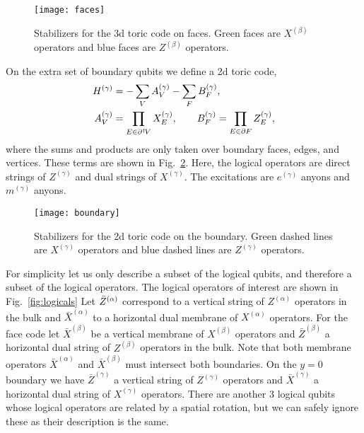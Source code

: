 \begin{figure}
\centering
\texttt{[image: faces]}
\caption[Stabilizers for the 3d toric code on faces]{Stabilizers for the 3d toric code on faces. Green faces are $X^{(\beta)}$ operators and blue faces are $Z^{(\beta)}$ operators.}
\label{fig:faces}
\end{figure}

On the extra set of boundary qubits we define a 2d toric code,
\begin{align}
\begin{aligned}
H^{(\gamma)} &= -\sum_VA_V^{(\gamma)} - \sum_F B_F^{(\gamma)},\\
A_V^{(\gamma)} &= \prod_{E\in\partial^\dagger\! V}X_E^{(\gamma)},\qquad B_F^{(\gamma)} = \prod_{E\in\partial F} Z_E^{(\gamma)},
\end{aligned}
\end{align}
where the sums and products are only taken over boundary faces, edges, and vertices. These terms are shown in Fig.~\ref{fig:boundary}. Here, the logical operators are direct strings of $Z^{(\gamma)}$ and dual strings of $X^{(\gamma)}$. The excitations are $e^{(\gamma)}$ anyons and $m^{(\gamma)}$ anyons.

\begin{figure}[th!]
\centering
\texttt{[image: boundary]}
\caption[Stabilizers for the 2d toric code on the boundary]{Stabilizers for the 2d toric code on the boundary. Green dashed lines are $X^{(\gamma)}$ operators and blue dashed lines are $Z^{(\gamma)}$ operators.}
\label{fig:boundary}
\end{figure}

For simplicity let us only describe a subset of the logical qubits, and therefore a subset of the logical operators. The logical operators of interest are shown in Fig.~\ref{fig:logicals} Let $\Bar{Z}^{(\alpha)}$ correspond to a vertical string of $Z^{(\alpha)}$ operators in the bulk and $\bar{X}^{(\alpha)}$ to a horizontal dual membrane of $X^{(\alpha)}$ operators. For the face code let $\bar{X}^{(\beta)}$ be a vertical membrane of $X^{(\beta)}$ operators and $\bar{Z}^{(\beta)}$ a horizontal dual string of $Z^{(\beta)}$ operators in the bulk. Note that both membrane operators $\bar{X}^{(\alpha)}$ and $\bar{X}^{(\beta)}$ must intersect both boundaries. On the $y=0$ boundary we have $\bar{Z}^{(\gamma)}$ a vertical string of $Z^{(\gamma)}$ operators and $\bar{X}^{(\gamma)}$ a horizontal dual string of $X^{(\gamma)}$ operators.  There are another 3 logical qubits whose logical operators are related by a spatial rotation, but we can safely ignore these as their description is the same. 


